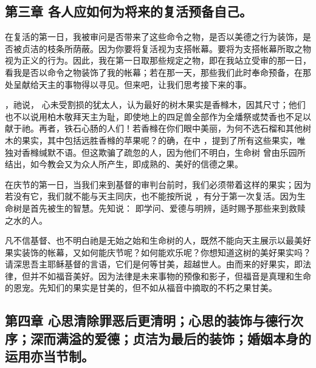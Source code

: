 
\subsection{第三章 各人应如何为将来的复活预备自己。}

在复活的第一日，我被审问是否带来了这些命令之物，是否以美德之行为装饰，是否被贞洁的枝条所荫蔽。因为你要将复活视为支搭帐幕。要将为支搭帐幕所取之物视为正义的行为。因此，我在第一日取那些规定之物，即在我站立受审的那一日，看我是否以命令之物装饰了我的帐幕；若在那一天，那些我们此时奉命预备，在那处呈献给天主的事物得以寻见。但来吧，让我们思考接下来的事。\par

，祂说， 心未受割损的犹太人，认为最好的树木果实是香橼木，因其尺寸；他们也不以说用柏木敬拜天主为耻，即使地上的四足兽全部作为全燔祭或焚香也不足以献于祂。再者，铁石心肠的人们！若香橼在你们眼中美丽，为何不选石榴和其他树木的果实，其中包括远胜香橼的苹果呢？的确，在中 ，提到了所有这些果实，唯独对香橼缄默不语。但这欺骗了疏忽的人，因为他们不明白，生命树  曾由乐园所结出，如今教会又为众人所产生，即成熟的、美好的信德之果。\par

在庆节的第一日，当我们来到基督的审判台前时，我们必须带着这样的果实；因为若没有它，我们就不能与天主同庆，也不能按所说 ，有分于第一次复活。因为生命树是首先被生的智慧。先知说：    即学问、爱德与明辨，适时赐予那些来到救赎之水的人。\par

凡不信基督、也不明白祂是无始之始和生命树的人，既然不能向天主展示以最美好果实装饰的帐幕，又如何能庆节呢？如何能欢乐呢？你想知道这树的美好果实吗？请深思吾主耶稣基督的言语，它们是何等甘美，超越世人。由而来的好果实，即法律，但并不如福音美好。因为法律是未来事物的预像和影子，但福音是真理和生命的恩宠。先知们的果实是甘美的，但不如从福音中摘取的不朽之果甘美。\par


\subsection{第四章 心思清除罪恶后更清明；心思的装饰与德行次序；深而满溢的爱德；贞洁为最后的装饰；婚姻本身的运用亦当节制。}

